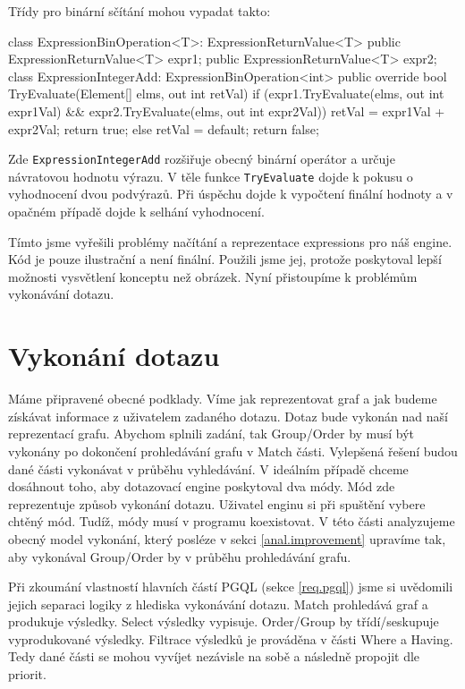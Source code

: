Třídy pro binární sčítání mohou vypadat takto:
\begin{code}
class ExpressionBinOperation<T>: ExpressionReturnValue<T> {
  public ExpressionReturnValue<T> expr1;
  public ExpressionReturnValue<T> expr2;
}
class ExpressionIntegerAdd: ExpressionBinOperation<int>{
  public override bool TryEvaluate(Element[] elms, out int retVal) {
    if (expr1.TryEvaluate(elms, out int expr1Val) &&
        expr2.TryEvaluate(elms, out int expr2Val)) {
      retVal = expr1Val + expr2Val;
      return true;
    } else {
      retVal = default;
      return false;
    }
  }
}
\end{code}
Zde \texttt{ExpressionIntegerAdd} rozšiřuje obecný binární operátor a určuje návratovou hodnotu výrazu.
V těle funkce \texttt{TryEvaluate} dojde k pokusu o vyhodnocení dvou podvýrazů.
Při úspěchu dojde k vypočtení finální hodnoty a v opačném případě dojde k selhání vyhodnocení. 

Tímto jsme vyřešili problémy načítání a reprezentace expressions pro náš engine.
Kód je pouze ilustrační a není finální.
Použili jsme jej, protože poskytoval lepší možnosti vysvětlení konceptu než obrázek.
Nyní přistoupíme k problémům vykonávání dotazu.

\clearpage

\section{Vykonání dotazu} \label{anal.vykonanidotazu}

Máme připravené obecné podklady.
Víme jak reprezentovat graf a jak budeme získávat informace z uživatelem zadaného dotazu.
Dotaz bude vykonán nad naší reprezentací grafu.
Abychom splnili zadání, tak Group/Order by musí být vykonány po dokončení prohledávání grafu v Match části.
Vylepšená řešení budou dané části vykonávat v průběhu vyhledávání.
V ideálním případě chceme dosáhnout toho, aby dotazovací engine poskytoval dva módy.
Mód zde reprezentuje způsob vykonání dotazu.
Uživatel enginu si při spuštění vybere chtěný mód.
Tudíž, módy musí v programu koexistovat.
V této části analyzujeme obecný model vykonání, který posléze v sekci \ref{anal.improvement} upravíme tak, aby vykonával Group/Order by v průběhu prohledávání grafu.

Při zkoumání vlastností hlavních částí PGQL (sekce \ref{req.pgql}) jsme si uvědomili jejich separaci logiky z hlediska vykonávání dotazu.
Match prohledává graf a produkuje výsledky. 
Select výsledky vypisuje. 
Order/Group by třídí/seskupuje vyprodukované výsledky.
Filtrace výsledků je prováděna v části Where a Having.
Tedy dané části se mohou vyvíjet nezávisle na sobě a následně propojit dle priorit.

